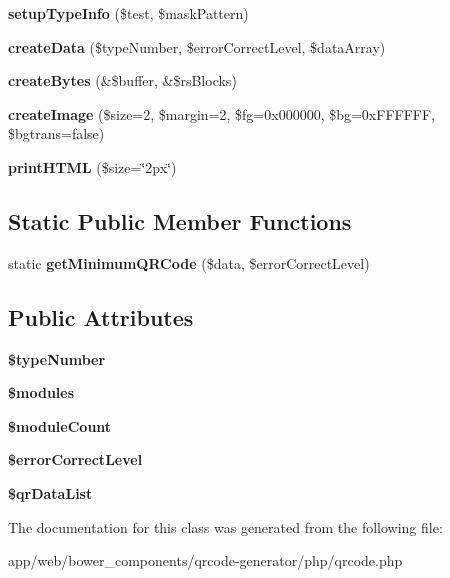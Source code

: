 \begin{DoxyCompactItemize}
\item 
\mbox{\label{class_q_r_code_ae9201f441a8c83af87c89e95a055e80a}} 
{\bfseries setup\+Type\+Info} (\$test, \$mask\+Pattern)
\item 
\mbox{\label{class_q_r_code_a15147456abc7b1f894bc1a97ab93de55}} 
{\bfseries create\+Data} (\$type\+Number, \$error\+Correct\+Level, \$data\+Array)
\item 
\mbox{\label{class_q_r_code_a5e593f7cfb5ee03e3c6fbd7cc3f4f04b}} 
{\bfseries create\+Bytes} (\&\$buffer, \&\$rs\+Blocks)
\item 
\mbox{\label{class_q_r_code_a744d68341c6da176cc375225626e8152}} 
{\bfseries create\+Image} (\$size=2, \$margin=2, \$fg=0x000000, \$bg=0x\+F\+F\+F\+F\+F\+F, \$bgtrans=false)
\item 
\mbox{\label{class_q_r_code_a0f125b9ca1c47632b0f001e1a015323f}} 
{\bfseries print\+H\+T\+ML} (\$size=\char`\"{}2px\char`\"{})
\end{DoxyCompactItemize}
\subsection*{Static Public Member Functions}
\begin{DoxyCompactItemize}
\item 
\mbox{\label{class_q_r_code_a8fa3d96a16c0d9c1bff13b9e53022c72}} 
static {\bfseries get\+Minimum\+Q\+R\+Code} (\$data, \$error\+Correct\+Level)
\end{DoxyCompactItemize}
\subsection*{Public Attributes}
\begin{DoxyCompactItemize}
\item 
\mbox{\label{class_q_r_code_aa23347e5ae35acb9809027b3eced6213}} 
{\bfseries \$type\+Number}
\item 
\mbox{\label{class_q_r_code_ae1c9ad9dda9d54337bf1d6445b6b0af5}} 
{\bfseries \$modules}
\item 
\mbox{\label{class_q_r_code_aae50ac56dfbf18e460c18456021ba007}} 
{\bfseries \$module\+Count}
\item 
\mbox{\label{class_q_r_code_a5028c5e6b6b33d7101e8b0aa056faf3e}} 
{\bfseries \$error\+Correct\+Level}
\item 
\mbox{\label{class_q_r_code_a274ae58c333fd87372ffb2af10230a58}} 
{\bfseries \$qr\+Data\+List}
\end{DoxyCompactItemize}


The documentation for this class was generated from the following file\+:\begin{DoxyCompactItemize}
\item 
app/web/bower\+\_\+components/qrcode-\/generator/php/qrcode.\+php\end{DoxyCompactItemize}
